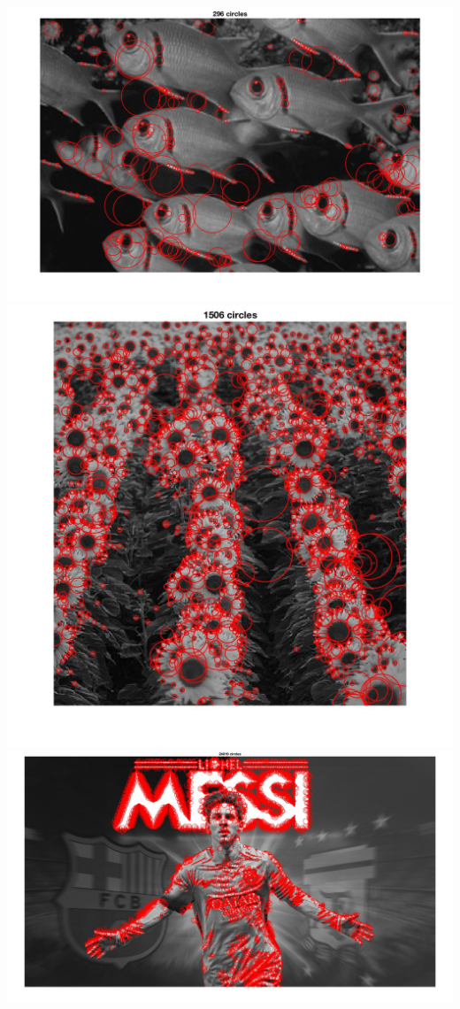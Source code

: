 \documentclass[a4paper,11pt]{article}
\begin{document}
\includegraphics[width=\textwidth]{hw2/code/3}\\
\includegraphics[scale=0.3]{hw2/code/4}\\
\includegraphics[width=\textwidth]{hw2/code/5}\\
\end{document}
